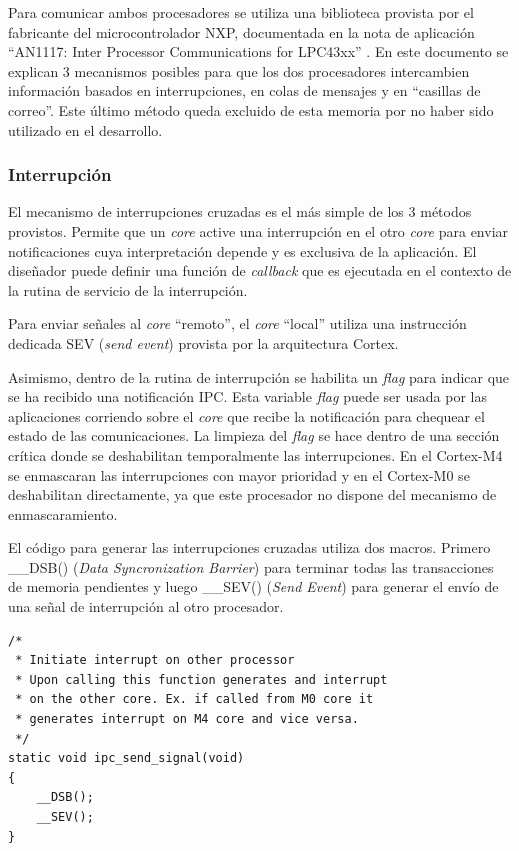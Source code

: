 Para comunicar ambos procesadores se utiliza una biblioteca provista por el fabricante del microcontrolador NXP, documentada en la nota de aplicación ``AN1117: Inter Processor Communications for LPC43xx'' \citep{nxp:an1117}. En este documento se explican 3 mecanismos posibles para que los dos procesadores intercambien información basados en interrupciones, en colas de mensajes y en ``casillas de correo''.  Este último método queda excluido de esta memoria por no haber sido utilizado en el desarrollo.

\subsubsection{Interrupción}
\label{subsubsec:interrupcion}

El mecanismo de interrupciones cruzadas es el más simple de los 3 métodos provistos.  Permite que un \textit{core} active una interrupción en el otro \textit{core} para enviar notificaciones cuya interpretación depende y es exclusiva de la aplicación.  El diseñador puede definir una función de \textit{callback} que es ejecutada en el contexto de la rutina de servicio de la interrupción.  

Para enviar señales al \textit{core} ``remoto'', el \textit{core} ``local'' utiliza una instrucción dedicada SEV (\textit{send event}) provista por la arquitectura Cortex.

Asimismo, dentro de la rutina de interrupción se habilita un \textit{flag} para indicar que se ha recibido una notificación IPC.  Esta variable \textit{flag} puede ser usada por las aplicaciones corriendo sobre el \textit{core} que recibe la notificación para chequear el estado de las comunicaciones. La limpieza del \textit{flag} se hace dentro de una sección crítica donde se deshabilitan temporalmente las interrupciones.  En el Cortex-M4 se enmascaran las interrupciones con mayor prioridad y en el Cortex-M0 se deshabilitan directamente, ya que este procesador no dispone del mecanismo de enmascaramiento.

El código para generar las interrupciones cruzadas utiliza dos macros. Primero \_\_DSB() (\textit{Data Syncronization Barrier}) para terminar todas las transacciones de memoria pendientes y luego \_\_SEV() (\textit{Send Event}) para generar el envío de una señal de interrupción al otro procesador.
\begin{verbatim}
/*
 * Initiate interrupt on other processor
 * Upon calling this function generates and interrupt 
 * on the other core. Ex. if called from M0 core it 
 * generates interrupt on M4 core and vice versa.
 */
static void ipc_send_signal(void)
{
  	__DSB();
  	__SEV();
}
\end{verbatim}\label{cod:interrupt}  

